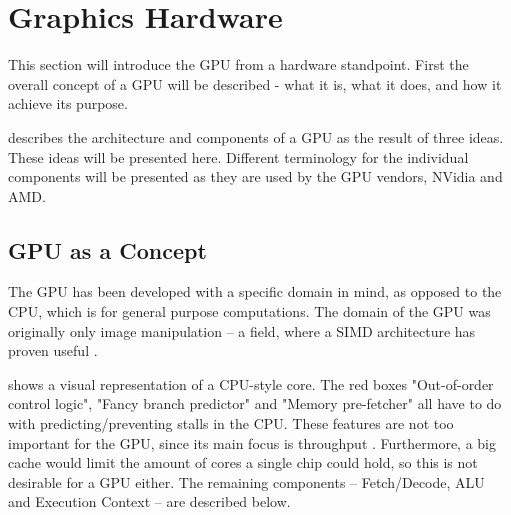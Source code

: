 \section{Graphics Hardware}\label{sec:graphics_hardware}


\begin{sectionmeta}
	
	This section will introduce the \gls{GPU} from a hardware standpoint. 
	First the overall concept of a \gls{GPU} will be described - what it is, what it does, and how it achieve its purpose.
	
	\cite{intro_to_gpu_arch} describes the architecture and components of a \gls{GPU} as the result of three ideas.
	These ideas will be presented here.
	Different terminology for the individual components will be presented as they are used by the \gls{GPU} vendors, NVidia and AMD. 
	
\end{sectionmeta}


\subsection{GPU as a Concept}
The \gls{GPU} has been developed with a specific domain in mind, as opposed to the CPU, which is for general purpose computations. 
The domain of the \gls{GPU} was originally only image manipulation -- a field, where a \gls{SIMD} architecture has proven useful .


 shows a visual representation of a \gls{CPU}-style core. 
The red boxes "Out-of-order control logic", "Fancy branch predictor" and "Memory pre-fetcher" all have to do with predicting/preventing stalls in the \gls{CPU}.
These features are not too important for the \gls{GPU}, since its main focus is throughput  . 
Furthermore, a big cache would limit the amount of cores a single chip could hold, so this is not desirable for a \gls{GPU} either.
The remaining components -- Fetch/Decode, \gls{ALU} and Execution Context -- are described below.

